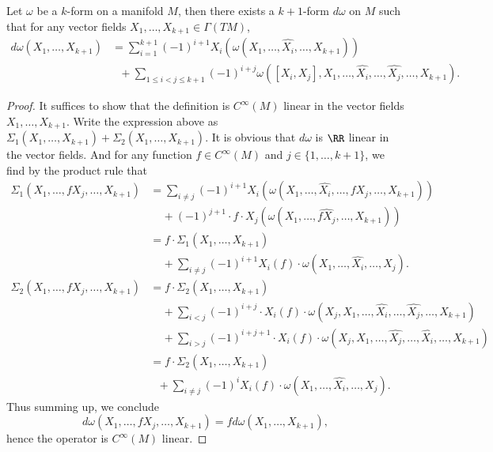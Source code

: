 \begin{theorem}
    Let $\omega$ be a $k$-form on a manifold $M$, then there exists a $k+1$-form $d\omega$ on $M$ such that for any vector fields $X_1, \dots, X_{k+1} \in \Gamma(TM)$,
    \begin{align*}
        d\omega(X_1, \dots, X_{k+1}) &= \sum_{i = 1}^{k+1} (-1)^{i+1} X_i(\omega(X_1, \dots, \widehat{X_i}, \dots, X_{k+1}))\\
        &\ \ \ + \sum_{1 \leq i < j \leq k+1} (-1)^{i+j} \omega([X_i,X_j],X_1, \dots, \widehat{X_i}, \dots, \widehat{X_j}, \dots, X_{k+1}).
    \end{align*}
\end{theorem}
\begin{proof}
    It suffices to show that the definition is $C^\infty(M)$ linear in the vector fields $X_1, \dots, X_{k+1}$. Write the expression above as $\Sigma_1(X_1, \dots, X_{k+1}) + \Sigma_2(X_1, \dots, X_{k+1})$. It is obvious that $d\omega$ is $\RR$ linear in the vector fields. And for any function $f \in C^\infty(M)$ and $j \in \{ 1, \dots, k+1 \}$, we find by the product rule that
    \begin{align*}
        \Sigma_1(X_1, \dots, fX_j, \dots, X_{k+1}) &= \sum_{i \neq j} (-1)^{i+1} X_i(\omega(X_1,\dots, \widehat{X_i}, \dots, fX_j, \dots, X_{k+1}))\\
        &\ \ \ \ \ + (-1)^{j+1} \cdot f \cdot X_j(\omega(X_1, \dots, \widehat{fX_j}, \dots, X_{k+1}))\\
        &= f \cdot \Sigma_1(X_1, \dots, X_{k+1})\\
        &\ \ \ \ \ + \sum_{i \neq j} (-1)^{i+1} X_i(f) \cdot \omega(X_1, \dots, \widehat{X_i}, \dots, X_j).
    \end{align*}
    \begin{align*}
        \Sigma_2(X_1, \dots, fX_j, \dots, X_{k+1}) &= f \cdot \Sigma_2(X_1, \dots, X_{k+1})\\
        &\ \ \ \ \ + \sum_{i < j} (-1)^{i+j} \cdot X_i(f) \cdot \omega(X_j, X_1, \dots, \widehat{X_i}, \dots, \widehat{X_j}, \dots, X_{k+1})\\
        &\ \ \ \ \ + \sum_{i > j} (-1)^{i+j + 1} \cdot X_i(f) \cdot \omega(X_j, X_1, \dots, \widehat{X_j}, \dots, \widehat{X_i}, \dots, X_{k+1})\\
        &= f \cdot \Sigma_2(X_1, \dots, X_{k+1})\\
        &\ \ \ + \sum_{i \neq j} (-1)^i X_i(f) \cdot \omega(X_1, \dots, \widehat{X_i}, \dots, X_j).
    \end{align*}
    Thus summing up, we conclude
    \[ d\omega(X_1, \dots, fX_j, \dots, X_{k+1}) = f d\omega(X_1, \dots, X_{k+1}), \]
    hence the operator is $C^\infty(M)$ linear.
\end{proof}

